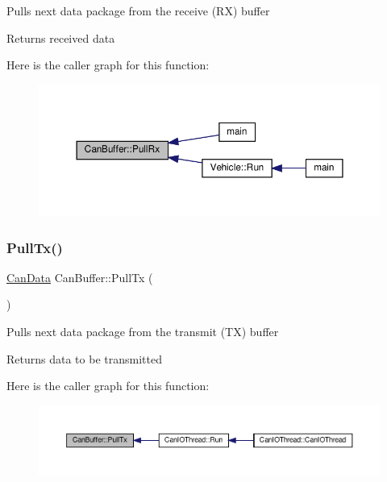 Pulls next data package from the receive (RX) buffer \begin{DoxyReturn}{Returns}
received data 
\end{DoxyReturn}
Here is the caller graph for this function\+:
\nopagebreak
\begin{figure}[H]
\begin{center}
\leavevmode
\includegraphics[width=350pt]{classCanBuffer_a66691d3306e47774f768fd391fff1802_icgraph}
\end{center}
\end{figure}
\mbox{\label{classCanBuffer_a06cbabdf2a97378a2d4cd9120e909d53}} 
\subsubsection{\texorpdfstring{Pull\+Tx()}{PullTx()}}
{\footnotesize\ttfamily \hyperlink{can__buffer_8h_a7a5dfa274d7d04c73e0b6b3e4dbbb87c}{Can\+Data} Can\+Buffer\+::\+Pull\+Tx (\begin{DoxyParamCaption}{ }\end{DoxyParamCaption})}

Pulls next data package from the transmit (TX) buffer \begin{DoxyReturn}{Returns}
data to be transmitted 
\end{DoxyReturn}
Here is the caller graph for this function\+:
\nopagebreak
\begin{figure}[H]
\begin{center}
\leavevmode
\includegraphics[width=350pt]{classCanBuffer_a06cbabdf2a97378a2d4cd9120e909d53_icgraph}
\end{center}
\end{figure}
\mbox{\label{classCanBuffer_a4b9e4e25a3312729bc64b0a7e7e80abf}} 
